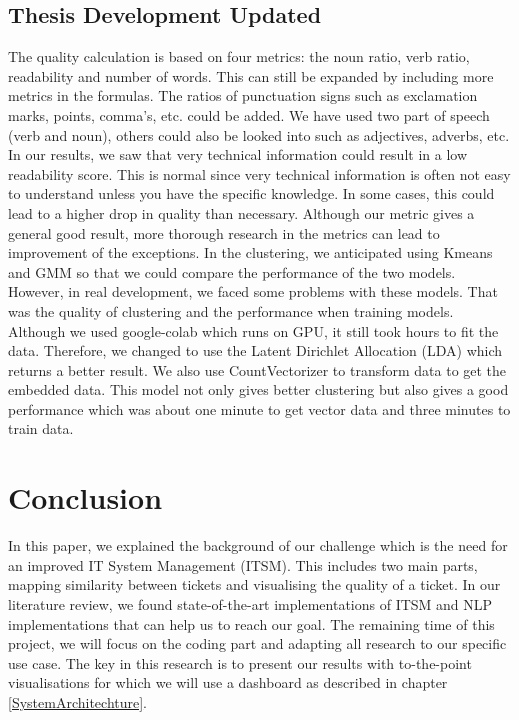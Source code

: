\documentclass[a4paper,12pt]{report}
\begin{document}
    \section{Thesis Development Updated}
    The quality calculation is based on four metrics: the noun ratio, verb ratio, readability and number of words. This can still be expanded by including more metrics in the formulas. The ratios of punctuation signs such as exclamation marks, points, comma's, etc. could be added. We have used two part of speech (verb and noun), others could also be looked into such as adjectives, adverbs, etc. In our results, we saw that very technical information could result in a low readability score. This is normal since very technical information is often not easy to understand unless you have the specific knowledge. In some cases, this could lead to a higher drop in quality than necessary.
    Although our metric gives a general good result, more thorough research in the metrics can lead to improvement of the exceptions.
    \newline\newline
    In the clustering, we anticipated using Kmeans and GMM so that we could compare the performance of the two models. However, in real development, we faced some problems with these models. That was the quality of clustering and the performance when training models. Although we used google-colab which runs on GPU, it still took hours to fit the data.
    Therefore, we changed to use the Latent Dirichlet Allocation (LDA) which returns a better result. We also use CountVectorizer to transform data to get the embedded data. This model not only gives better clustering but also gives a good performance which was about one minute to get vector data and three minutes to train data.
    
    
    \chapter{Conclusion}
    In this paper, we explained the background of our challenge which is the need for an improved IT System Management (ITSM). This includes two main parts, mapping similarity between tickets and visualising the quality of a ticket. In our literature review, we found state-of-the-art implementations of ITSM and NLP implementations that can help us to reach our goal. The remaining time of this project, we will focus on the coding part and adapting all research to our specific use case. The key in this research is to present our results with to-the-point visualisations for which we will use a dashboard as described in chapter \vref{SystemArchitechture}.
\end{document}
